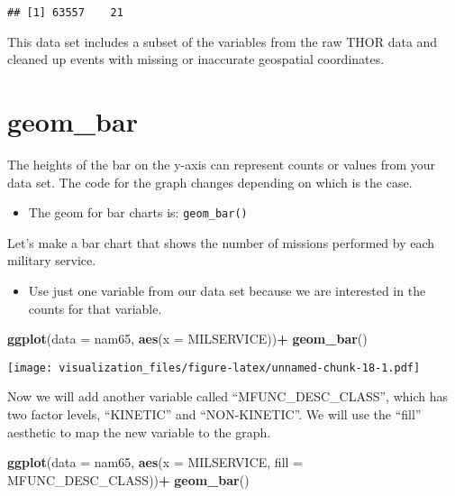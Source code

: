 \documentclass[oneside]{memoir}
\newenvironment{Shaded}{\begin{snugshade}}{\end{snugshade}}
\newcommand{\KeywordTok}[1]{\textcolor[rgb]{0.13,0.29,0.53}{\textbf{#1}}}
\newcommand{\DataTypeTok}[1]{\textcolor[rgb]{0.13,0.29,0.53}{#1}}
\newcommand{\StringTok}[1]{\textcolor[rgb]{0.31,0.60,0.02}{#1}}
\newcommand{\OperatorTok}[1]{\textcolor[rgb]{0.81,0.36,0.00}{\textbf{#1}}}
\newcommand{\NormalTok}[1]{#1}
\providecommand{\tightlist}{%
  \setlength{\itemsep}{0pt}\setlength{\parskip}{0pt}}
\theoremstyle{definition}
\theoremstyle{definition}
\theoremstyle{definition}
\theoremstyle{remark}
\begin{document}
\begin{verbatim}
## [1] 63557    21
\end{verbatim}

This data set includes a subset of the variables from the raw THOR data
and cleaned up events with missing or inaccurate geospatial coordinates.

\section{geom\_bar}\label{geom_bar}

The heights of the bar on the y-axis can represent counts or values from
your data set. The code for the graph changes depending on which is the
case.

\begin{itemize}
\tightlist
\item
  The geom for bar charts is: \texttt{geom\_bar()}
\end{itemize}

Let's make a bar chart that shows the number of missions performed by
each military service.

\begin{itemize}
\tightlist
\item
  Use just one variable from our data set because we are interested in
  the counts for that variable.
\end{itemize}

\begin{Shaded}
\begin{Highlighting}[]
\KeywordTok{ggplot}\NormalTok{(}\DataTypeTok{data =}\NormalTok{ nam65, }\KeywordTok{aes}\NormalTok{(}\DataTypeTok{x =}\NormalTok{ MILSERVICE))}\OperatorTok{+}
\StringTok{  }\KeywordTok{geom_bar}\NormalTok{()}
\end{Highlighting}
\end{Shaded}

\texttt{[image: visualization\_files/figure-latex/unnamed-chunk-18-1.pdf]}

Now we will add another variable called ``MFUNC\_DESC\_CLASS'', which
has two factor levels, ``KINETIC'' and ``NON-KINETIC''. We will use the
``fill'' aesthetic to map the new variable to the graph.

\begin{Shaded}
\begin{Highlighting}[]
\KeywordTok{ggplot}\NormalTok{(}\DataTypeTok{data =}\NormalTok{ nam65, }\KeywordTok{aes}\NormalTok{(}\DataTypeTok{x =}\NormalTok{ MILSERVICE, }\DataTypeTok{fill =}\NormalTok{ MFUNC_DESC_CLASS))}\OperatorTok{+}
\StringTok{  }\KeywordTok{geom_bar}\NormalTok{()}
\end{Highlighting}
\end{Shaded}
\end{document}
